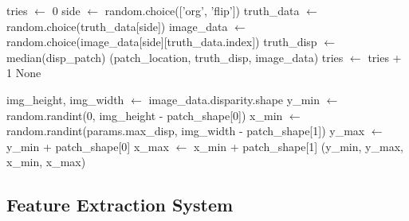 \documentclass[12pt]{article}
\begin{document}
\begin{algorithm}[H]
\caption{Random Patch Sampling with Validation}
\begin{algorithmic}[1]
\State tries $\gets$ 0
\State {}
    \State side $\gets$ random.choice(['org', 'flip'])
    \State truth\_data $\gets$ random.choice(truth\_data[side])
    \State image\_data $\gets$ random.choice(image\_data[side][truth\_data.index])
    \State {}
    \State truth\_disp $\gets$ median(disp\_patch)
    \State {}
        \State {}
            \State \Return (patch\_location, truth\_disp, image\_data)
        \EndIf
    \EndIf
    \State tries $\gets$ tries + 1
\EndWhile
\State \Return None 
\EndFunction

\State img\_height, img\_width $\gets$ image\_data.disparity.shape
\State y\_min $\gets$ random.randint(0, img\_height - patch\_shape[0])
\State x\_min $\gets$ random.randint(params.max\_disp, img\_width - patch\_shape[1])
\State y\_max $\gets$ y\_min + patch\_shape[0]
\State x\_max $\gets$ x\_min + patch\_shape[1]
\State \Return (y\_min, y\_max, x\_min, x\_max)
\EndFunction
\end{algorithmic}
\end{algorithm}

\subsection{Feature Extraction System}
\end{document}
